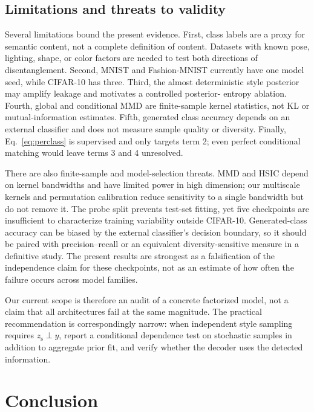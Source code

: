 \documentclass{article}
\newcommand{\zs}{z_{\mathrm{s}}}
\begin{document}
\subsection{Limitations and threats to validity}

Several limitations bound the present evidence.  First, class labels are a
proxy for semantic content, not a complete definition of content.  Datasets
with known pose, lighting, shape, or color factors are needed to test both
directions of disentanglement.  Second, MNIST and Fashion-MNIST currently have
one model seed, while CIFAR-10 has three.  Third, the almost deterministic
style posterior may amplify leakage and motivates a controlled posterior-
entropy ablation.  Fourth, global and conditional MMD are finite-sample
kernel statistics, not KL or mutual-information estimates.  Fifth, generated
class accuracy depends on an external classifier and does not measure sample
quality or diversity.  Finally, Eq.~\ref{eq:perclass} is supervised and only
targets term 2; even perfect conditional matching would leave terms 3 and 4
unresolved.

There are also finite-sample and model-selection threats.  MMD and HSIC depend
on kernel bandwidths and have limited power in high dimension; our multiscale
kernels and permutation calibration reduce sensitivity to a single bandwidth
but do not remove it.  The probe split prevents test-set fitting, yet five
checkpoints are insufficient to characterize training variability outside
CIFAR-10.  Generated-class accuracy can be biased by the external classifier's
decision boundary, so it should be paired with precision--recall or an
equivalent diversity-sensitive measure in a definitive study.  The present
results are strongest as a falsification of the independence claim for these
checkpoints, not as an estimate of how often the failure occurs across model
families.

Our current scope is therefore an audit of a concrete factorized model, not a
claim that all architectures fail at the same magnitude.  The practical
recommendation is correspondingly narrow: when independent style sampling
requires $\zs\perp y$, report a conditional dependence test on stochastic
samples in addition to aggregate prior fit, and verify whether the decoder
uses the detected information.

\section{Conclusion}
\end{document}

